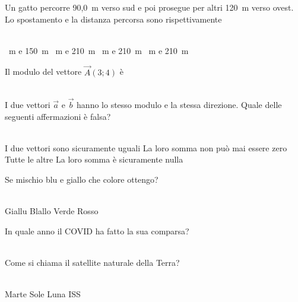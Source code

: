 \documentclass[a4paper,11pt]{exam}
\begin{document}
    
    \newpage
    
    

        \begin{center} 
        \end{center}
\begin{questions}

    
\question Un gatto percorre 90,0~m verso sud e poi prosegue per altri 120~m verso ovest. Lo spostamento e la distanza percorsa sono rispettivamente\\\
\begin{oneparchoices}
  ~m e 150~m
  ~m e 210~m
  ~m e 210~m
  ~m e 210~m
\end{oneparchoices}

    
\question Il modulo del vettore $\vec{A}(3;4)$ è\\\
\begin{oneparchoices}
  \choice 25
\end{oneparchoices}

    
\question I due vettori $\vec{a}$ e $\vec{b}$ hanno lo stesso modulo e la stessa direzione. Quale delle seguenti affermazioni è falsa?\\\
\begin{oneparchoices}
  \choice I due vettori sono sicuramente uguali
  \choice La loro somma non può mai essere zero
  \choice Tutte le altre
  \choice La loro somma è sicuramente nulla
\end{oneparchoices}

    
\question Se mischio blu e giallo che colore ottengo?\\\
\begin{oneparchoices}
  \choice Giallu
  \choice Blallo
  \choice Verde
  \choice Rosso
\end{oneparchoices}

    
\question In quale anno il COVID ha fatto la sua comparsa?\\\
\begin{oneparchoices}
  \choice 2020
  \choice 2001
  \choice 2019
  \choice 1943
\end{oneparchoices}

    
\question Come si chiama il satellite naturale della Terra?\\\
\begin{oneparchoices}
  \choice Marte
  \choice Sole
  \choice Luna
  \choice ISS
\end{oneparchoices}


\end{questions}
\end{document}
